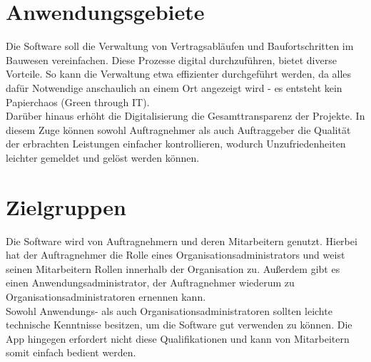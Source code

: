 \section{Anwendungsgebiete}
Die Software soll die Verwaltung von Vertragsabläufen und Baufortschritten im Bauwesen vereinfachen.
Diese Prozesse digital durchzuführen, bietet diverse Vorteile.
So kann die Verwaltung etwa effizienter durchgeführt werden, da alles dafür Notwendige anschaulich an einem Ort angezeigt wird - es entsteht kein Papierchaos (Green through IT).\\
Darüber hinaus erhöht die Digitalisierung die Gesamttransparenz der Projekte.
In diesem Zuge können sowohl Auftragnehmer als auch Auftraggeber die Qualität der erbrachten Leistungen einfacher kontrollieren, wodurch Unzufriedenheiten leichter gemeldet und gelöst werden können.

\section{Zielgruppen}
Die Software wird von Auftragnehmern und deren Mitarbeitern genutzt.
Hierbei hat der Auftragnehmer die Rolle eines Organisationsadministrators und weist seinen Mitarbeitern Rollen innerhalb der Organisation zu.
Außerdem gibt es einen Anwendungsadministrator, der Auftragnehmer wiederum zu Organisationsadministratoren ernennen kann.\\
Sowohl Anwendungs- als auch Organisationsadministratoren sollten leichte technische Kenntnisse besitzen, um die Software gut verwenden zu können.
Die App hingegen erfordert nicht diese Qualifikationen und kann von Mitarbeitern somit einfach bedient werden.

